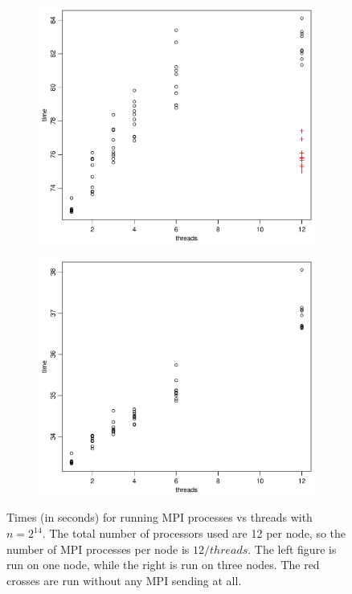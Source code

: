 \begin{figure}[h!]
  \centering
  \begin{subfigure}[b]{0.48\textwidth}
    \includegraphics[width=\textwidth]{./Figures/taskc1.pdf}
  \end{subfigure}%
  \quad
  \begin{subfigure}[b]{0.48\textwidth}
    \includegraphics[width=\textwidth]{./Figures/taskc2.pdf}
  \end{subfigure}
  \vspace{-0.1\baselineskip}
  \caption{Times (in seconds) for running MPI processes vs threads with $n = 2^{14}$. The total number of processors used are 12 per node, so the number of MPI processes per node is $12 / threads$. The left figure is run on one node, while the right is run on three nodes. The red crosses are run without any MPI sending at all.}
  \label{fig:taskc}
\end{figure}
%
